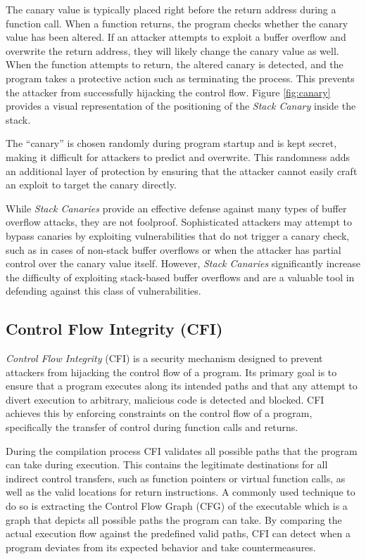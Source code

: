The canary value is typically placed right before the return address during a function
call. When a function returns, the program checks whether the canary value has been
altered. If an attacker attempts to exploit a buffer overflow and overwrite the
return address, they will likely change the canary value as well. When the
function attempts to return, the altered canary is detected, and the program
takes a protective action such as terminating the process. This prevents the attacker
from successfully hijacking the control flow. Figure \ref{fig:canary} provides a
visual representation of the positioning of the \textit{Stack Canary} inside the
stack.

The ``canary'' is chosen randomly during program startup and is kept secret,
making it difficult for attackers to predict and overwrite. This randomness adds
an additional layer of protection by ensuring that the attacker cannot easily craft
an exploit to target the canary directly.

While \textit{Stack Canaries} provide an effective defense against many types of
buffer overflow attacks, they are not foolproof. Sophisticated attackers may
attempt to bypass canaries by exploiting vulnerabilities that do not trigger a
canary check, such as in cases of non-stack buffer overflows or when the attacker
has partial control over the canary value itself. However, \textit{Stack
Canaries} significantly increase the difficulty of exploiting stack-based buffer
overflows and are a valuable tool in defending against this class of
vulnerabilities.

\subsection{Control Flow Integrity (CFI)}
\label{subsec:background_cfi}

\textit{Control Flow Integrity} (CFI) is a security mechanism designed to
prevent attackers from hijacking the control flow of a program. Its primary goal
is to ensure that a program executes along its intended paths and that any attempt
to divert execution to arbitrary, malicious code is detected and blocked. CFI achieves
this by enforcing constraints on the control flow of a program, specifically the
transfer of control during function calls and returns.

During the compilation process CFI validates all possible paths that the program
can take during execution. This contains the legitimate destinations for all indirect
control transfers, such as function pointers or virtual function calls, as well as
the valid locations for return instructions. A commonly used technique to do so
is extracting the Control Flow Graph (CFG) of the executable which is a graph
that depicts all possible paths the program can take. By comparing the actual execution
flow against the predefined valid paths, CFI can detect when a program deviates
from its expected behavior and take countermeasures.

